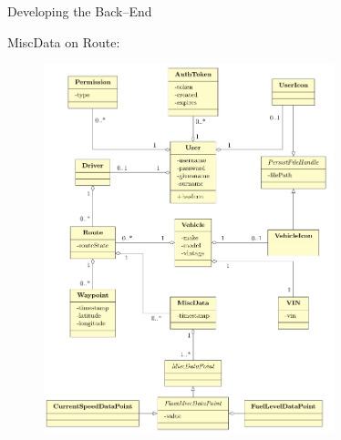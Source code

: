 \begin{frame}{Developing the Back--End}
             {
            MiscData on Route:
            \begin{figure}[htb]
                \centering
                \includegraphics[width=0.75\textwidth, trim={0 0 0 9.2cm},clip]{class_diagram.png}
            \end{figure}
            }
        \end{frame}

